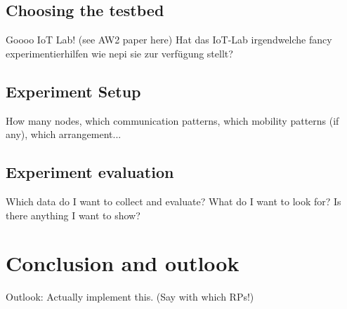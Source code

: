 \documentclass{acm_proc_article-sp}
\begin{document}
\subsection{Choosing the testbed}
\label{subsec:testbed_choice}
Goooo IoT Lab! (see AW2 paper here)
Hat das IoT-Lab irgendwelche fancy experimentierhilfen wie nepi sie zur verfügung stellt?

\subsection{Experiment Setup}
\label{subsec:setup}
How many nodes, which communication patterns, which mobility patterns (if any), which arrangement...

\subsection{Experiment evaluation}
\label{subsec:evaluation}
Which data do I want to collect and evaluate? What do I want to look for? Is there anything I want to show?


\section{Conclusion and outlook}
\label{sec:Conclusion}

Outlook: Actually implement this. (Say with which RPs!)



\end{document}
